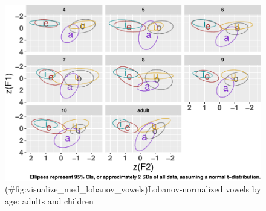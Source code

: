 \documentclass[
]{article}
\begin{document}
\begin{figure}
\centering
\includegraphics{3_vtl_results_files/figure-latex/visualize_med_lobanov_vowels-1.pdf}
\caption{(\#fig:visualize\_med\_lobanov\_vowels)Lobanov-normalized vowels by age: adults and children}
\end{figure}
\end{document}
